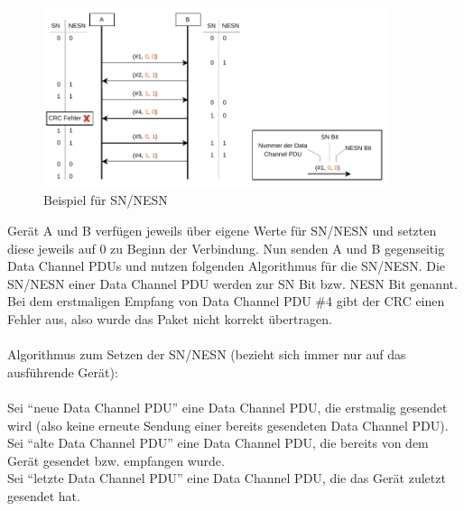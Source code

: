 \begin{figure}[H]
    \centering
    \includegraphics[width=0.9\textwidth]{graphics/nesn_sn_bsp.pdf}
    \caption[Beispiel für SN/NESN]{Beispiel für SN/NESN}
    \label{fig: anhang nesn sn}
\end{figure}
Gerät A und B verfügen jeweils über eigene Werte für SN/NESN und setzten diese jeweils auf 0 zu Beginn der Verbindung. Nun senden A und B gegenseitig Data Channel PDUs und nutzen folgenden Algorithmus für die SN/NESN. Die SN/NESN einer Data Channel PDU werden zur SN Bit bzw. NESN Bit genannt. Bei dem erstmaligen Empfang von Data Channel PDU \#4 gibt der CRC einen Fehler aus, also wurde das Paket nicht korrekt übertragen. 
\\\\
Algorithmus zum Setzen der SN/NESN \cite{BtSpec4.0_2239-2241} (bezieht sich immer nur auf das ausführende Gerät):
\\\\
Sei "`neue Data Channel PDU"' eine Data Channel PDU, die erstmalig gesendet wird (also keine erneute Sendung einer bereits gesendeten Data Channel PDU).\\
Sei "`alte Data Channel PDU"' eine Data Channel PDU, die bereits von dem Gerät gesendet bzw. empfangen wurde.\\
Sei "`letzte Data Channel PDU"' eine Data Channel PDU, die das Gerät zuletzt gesendet hat.

